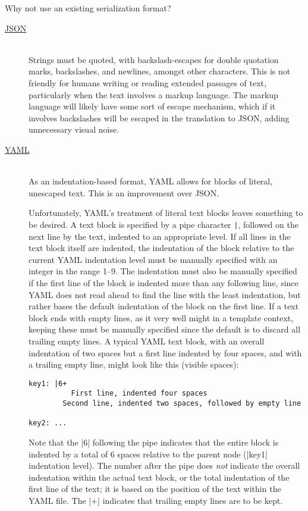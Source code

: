 \documentclass[11pt]{article}
\newcommand{\verbpipe}{\textcolor{DarkRed}{\texttt{\string|}}}
\begin{document}
Why not use an existing serialization format?
\begin{description}
\item[\href{http://www.json.org/}{JSON}]\hfill\\
Strings must be quoted, with backslash-escapes for double quotation marks, backslashes, and newlines, amongst other characters.  This is not friendly for humans writing or reading extended passages of text, particularly when the text involves a markup language.  The markup language will likely have some sort of escape mechanism, which if it involves backslashes will be escaped in the translation to JSON, adding unnecessary visual noise.

\item[\href{http://yaml.org/}{YAML}]\hfill\\
As an indentation-based format, YAML allows for blocks of literal, unescaped text.  This is an improvement over JSON.

Unfortunately, YAML's treatment of literal text blocks leaves something to be desired.  A text block is specified by a pipe character \verbpipe, followed on the next line by the text, indented to an appropriate level.  If all lines in the text block itself are indented, the indentation of the block relative to the current YAML indentation level must be manually specified with an integer in the range 1--9.  The indentation must also be manually specified if the first line of the block is indented more than any following line, since YAML does not read ahead to find the line with the least indentation, but rather bases the default indentation of the block on the first line.  If a text block ends with empty lines, as it very well might in a template context, keeping these must be manually specified since the default is to discard all trailing empty lines.  A typical YAML text block, with an overall indentation of two spaces but a first line indented by four spaces, and with a trailing empty line, might look like this (visible spaces):
\begin{Verbatim}[showspaces]
key1: |6+
          First line, indented four spaces
        Second line, indented two spaces, followed by empty line

key2: ...
\end{Verbatim}
Note that the |6| following the pipe indicates that the entire block is indented by a total of 6 spaces relative to the parent node (|key1| indentation level).  The number after the pipe does \emph{not} indicate the overall indentation within the actual text block, or the total indentation of the first line of the text; it is based on the position of the text within the YAML file.  The |+| indicates that trailing empty lines are to be kept.


\end{description}
\end{document}

